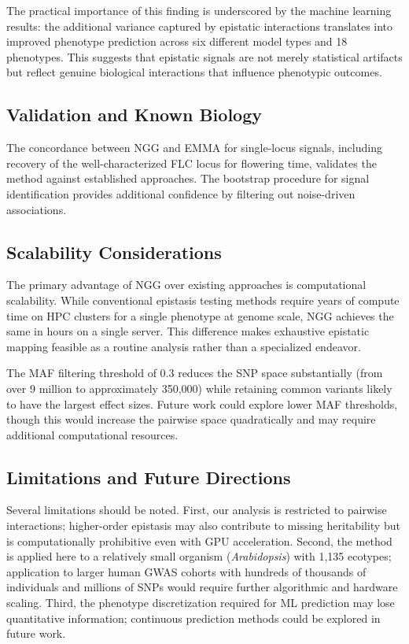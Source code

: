 \documentclass[11pt]{article}
\begin{document}
The practical importance of this finding is underscored by the machine learning results: the additional variance captured by epistatic interactions translates into improved phenotype prediction across six different model types and 18 phenotypes. This suggests that epistatic signals are not merely statistical artifacts but reflect genuine biological interactions that influence phenotypic outcomes.

\subsection{Validation and Known Biology}

The concordance between NGG and EMMA for single-locus signals, including recovery of the well-characterized FLC locus for flowering time, validates the method against established approaches. The bootstrap procedure for signal identification provides additional confidence by filtering out noise-driven associations.

\subsection{Scalability Considerations}

The primary advantage of NGG over existing approaches is computational scalability. While conventional epistasis testing methods require years of compute time on HPC clusters for a single phenotype at genome scale, NGG achieves the same in hours on a single server. This difference makes exhaustive epistatic mapping feasible as a routine analysis rather than a specialized endeavor.

The MAF filtering threshold of 0.3 reduces the SNP space substantially (from over 9 million to approximately 350,000) while retaining common variants likely to have the largest effect sizes. Future work could explore lower MAF thresholds, though this would increase the pairwise space quadratically and may require additional computational resources.

\subsection{Limitations and Future Directions}

Several limitations should be noted. First, our analysis is restricted to pairwise interactions; higher-order epistasis may also contribute to missing heritability but is computationally prohibitive even with GPU acceleration. Second, the method is applied here to a relatively small organism (\textit{Arabidopsis}) with 1,135 ecotypes; application to larger human GWAS cohorts with hundreds of thousands of individuals and millions of SNPs would require further algorithmic and hardware scaling. Third, the phenotype discretization required for ML prediction may lose quantitative information; continuous prediction methods could be explored in future work.
\end{document}
